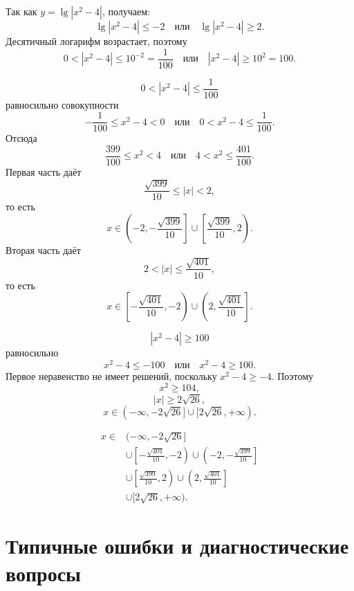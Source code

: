
Так как \(y=\lg|x^2-4|\), получаем:
\[
  \lg|x^2-4|\le-2
  \quad\text{или}\quad
  \lg|x^2-4|\ge2.
\]
Десятичный логарифм возрастает, поэтому
\[
  0<|x^2-4|\le10^{-2}=\frac1{100}
  \quad\text{или}\quad
  |x^2-4|\ge10^2=100.
\]

\argregimesteacherfigure


\[
  0<|x^2-4|\le\frac1{100}
\]
равносильно совокупности
\[
  -\frac1{100}\le x^2-4<0
  \quad\text{или}\quad
  0<x^2-4\le\frac1{100}.
\]
Отсюда
\[
  \frac{399}{100}\le x^2<4
  \quad\text{или}\quad
  4<x^2\le\frac{401}{100}.
\]
Первая часть даёт
\[
  \frac{\sqrt{399}}{10}\le|x|<2,
\]
то есть
\[
  x\in
  \left(-2,-\frac{\sqrt{399}}{10}\right]
  \cup
  \left[\frac{\sqrt{399}}{10},2\right).
\]
Вторая часть даёт
\[
  2<|x|\le\frac{\sqrt{401}}{10},
\]
то есть
\[
  x\in
  \left[-\frac{\sqrt{401}}{10},-2\right)
  \cup
  \left(2,\frac{\sqrt{401}}{10}\right].
\]


\[
  |x^2-4|\ge100
\]
равносильно
\[
  x^2-4\le-100
  \quad\text{или}\quad
  x^2-4\ge100.
\]
Первое неравенство не имеет решений, поскольку \(x^2-4\ge-4\). Поэтому
\[
  x^2\ge104,
\]
\[
  |x|\ge2\sqrt{26},
\]
\[
  x\in(-\infty,-2\sqrt{26}]\cup[2\sqrt{26},+\infty).
\]


\[
\boxed{
\begin{aligned}
  x\in{}&(-\infty,-2\sqrt{26}]\\
  &\cup\left[-\frac{\sqrt{401}}{10},-2\right)
  \cup\left(-2,-\frac{\sqrt{399}}{10}\right]\\
  &\cup\left[\frac{\sqrt{399}}{10},2\right)
  \cup\left(2,\frac{\sqrt{401}}{10}\right]\\
  &\cup[2\sqrt{26},+\infty).
\end{aligned}}
\]

\finalnumberlineteacherfigure

\section{Типичные ошибки и диагностические вопросы}


